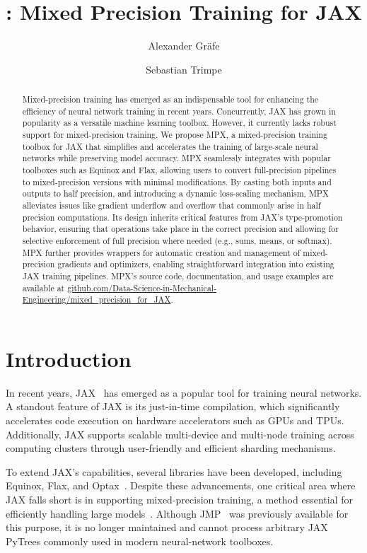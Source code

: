 \documentclass[copyright, logo]{dsme}
\title{\mpx{}: Mixed Precision Training for JAX}
\author[1]{Alexander Gräfe}
\author[1]{Sebastian Trimpe}
\affil[1]{Institute for Data Science in Mechanical Engineering (DSME), RWTH Aachen University}
\newcommand{\mpx}{\textsc{MPX}}
\begin{document}
\sloppy
\maketitle
\begin{abstract}
Mixed-precision training has emerged as an indispensable tool for enhancing the efficiency of neural network training in recent years. 
    Concurrently, JAX has grown in popularity as a versatile machine learning toolbox.
    However, it currently lacks robust support for mixed-precision training.
    We propose MPX, a mixed-precision training toolbox for JAX that simplifies and accelerates the training of large-scale neural networks while preserving model accuracy. 
    MPX seamlessly integrates with popular toolboxes such as Equinox and Flax, allowing users to convert full-precision pipelines to mixed-precision versions with minimal modifications. 
    By casting both inputs and outputs to half precision, and introducing a dynamic loss-scaling mechanism, MPX alleviates issues like gradient underflow and overflow that commonly arise in half precision computations. 
    Its design inherits critical features from JAX's type-promotion behavior, ensuring that operations take place in the correct precision and allowing for selective enforcement of full precision where needed (e.g., sums, means, or softmax). 
    MPX further provides wrappers for automatic creation and management of mixed-precision gradients and optimizers, enabling straightforward integration into existing JAX training pipelines.
    \mpx{}'s source code, documentation, and usage examples are available at \url{github.com/Data-Science-in-Mechanical-Engineering/mixed_precision_for_JAX}.
\end{abstract}

\section{Introduction}

In recent years, JAX~\citep{deepmind2020jax} has emerged as a popular tool for training neural networks. 
A standout feature of JAX is its just-in-time compilation, which significantly accelerates code execution on hardware accelerators such as GPUs and TPUs. 
Additionally, JAX supports scalable multi-device and multi-node training across computing clusters through user-friendly and efficient sharding mechanisms.

To extend JAX's capabilities, several libraries have been developed, including Equinox, Flax, and Optax~\citep{kidger2021equinox,flax2020github,deepmind2020jax}. 
Despite these advancements, one critical area where JAX falls short is in supporting mixed-precision training, a method essential for efficiently handling large models~\citep{mixed_precision_paper}. 
Although JMP~\citep{jmp} was previously available for this purpose, it is no longer maintained and cannot process arbitrary JAX PyTrees commonly used in modern neural-network toolboxes.
\end{document}
